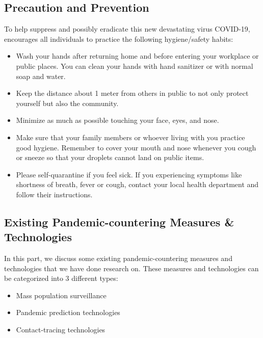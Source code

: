     \subsection{Precaution and Prevention}
      \par To help suppress and possibly eradicate this new devastating virus COVID-19, \textcite{Q&A_WHO} encourages all individuals to practice the following hygiene/safety habits:
      \begin{itemize}
        \item Wash your hands after returning home and before entering your workplace or public places. You can clean your hands with hand sanitizer or with normal soap and water.
        \item Keep the distance about 1 meter from others in public to not only protect yourself but also the community.
        \item Minimize as much as possible touching your face, eyes, and nose.
        \item Make sure that your family members or whoever living with you practice good hygiene. Remember to cover your mouth and nose whenever you cough or sneeze so that your droplets cannot land on public items.
        \item Please self-quarantine if you feel sick. If you experiencing symptoms like shortness of breath, fever or cough, contact your local health department and follow their instructions.
      \end{itemize}

    \subsection{Existing Pandemic-countering Measures \& Technologies}
      \par In this part, we discuss some existing pandemic-countering measures and technologies that we have done research on. These measures and technologies can be categorized into 3 different types:
      \begin{itemize}
        \item Mass population surveillance
        \item Pandemic prediction technologies
        \item Contact-tracing technologies
      \end{itemize}

